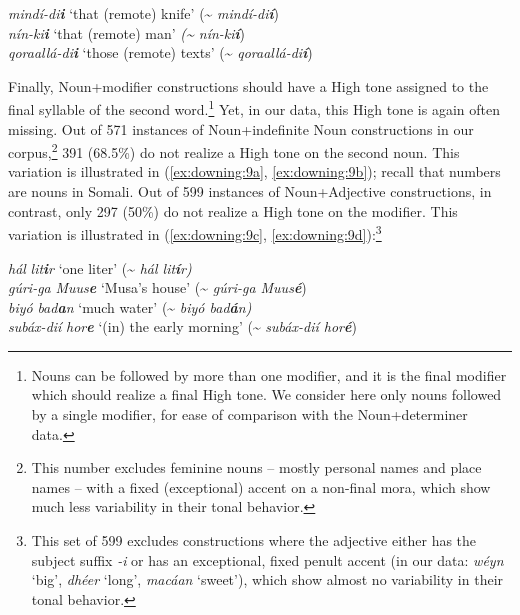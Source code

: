 \documentclass[output=paper]{langscibook}
\begin{document}
\ea \label{ex:downing:8}
\ea  \textit{mindí-di}\textbf{\textit{i}}  ‘that (remote) knife’  (\textasciitilde \textit{ mindí-di}\textbf{\textit{í}})\\
\ex   \textit{nín-ki}\textbf{\textit{i}}  ‘that (remote) man’  \textit{({\textasciitilde} nín-ki}\textbf{\textit{í}})\\
\ex   \textit{qoraallá-di}\textbf{\textit{i}}  ‘those (remote) texts’  (\textasciitilde \textit{ qoraallá-di}\textbf{\textit{í}})\\
\z
\z

Finally, Noun+modifier constructions should have a High tone assigned to the final syllable of the second word.\footnote{Nouns can be followed by more than one modifier, and it is the final modifier which should realize a final High tone. We consider here only nouns followed by a single modifier, for ease of comparison with the Noun+determiner data.} Yet, in our data, this High tone is again often missing. Out of 571 instances of Noun+indefinite Noun constructions in our corpus,\footnote{This number excludes feminine nouns – mostly personal names and place names – with a fixed (exceptional) accent on a non-final mora, which show much less variability in their tonal behavior.} 391 (68.5\%) do not realize a High tone on the second noun. This variation is illustrated in (\ref{ex:downing:9a}, \ref{ex:downing:9b}); recall that numbers are nouns in Somali. Out of 599 instances of Noun+Adjective constructions, in contrast, only 297 (50\%) do not realize a High tone on the modifier. This variation is illustrated in (\ref{ex:downing:9c}, \ref{ex:downing:9d}):\footnote{This set of 599 excludes constructions where the adjective either has the subject suffix \textit{-i} or has an exceptional, fixed penult accent (in our data: \textit{wéyn} ‘big’, \textit{dhéer} ‘long’, \textit{macáan} ‘sweet’), which show almost no variability in their tonal behavior.}\pagebreak


\ea \label{ex:downing:9}
\ea  \textit{hál} \textit{lit}\textbf{\textit{i}}\textit{r}  ‘one liter’  ({\textasciitilde} \textit{hál lit}\textbf{\textit{í}}\textit{r)}  \label{ex:downing:9a}\\
\ex   \textit{gúri-ga} \textit{Muus}\textbf{\textit{e}}  ‘Musa’s house’  ({\textasciitilde} \textit{gúri-ga Muus}\textbf{\textit{é}}) \label{ex:downing:9b}\\
\ex   \textit{biyó} \textit{bad}\textbf{\textit{a}}\textit{n}  ‘much water’  ({\textasciitilde} \textit{biyó bad}\textbf{\textit{á}}\textit{n)} \label{ex:downing:9c}\\
\ex   \textit{subáx-dií} \textit{hor}\textbf{\textit{e}}  ‘(in) the early morning’  ({\textasciitilde} \textit{subáx-dií hor}\textbf{\textit{é}}) \label{ex:downing:9d}\\
\z
\z
\end{document}
